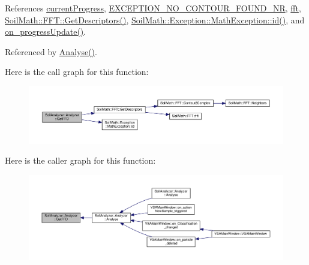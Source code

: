 References \hyperlink{analyzer_8h_source_l00067}{current\+Progress}, \hyperlink{_math_exception_8h_source_l00012}{E\+X\+C\+E\+P\+T\+I\+O\+N\+\_\+\+N\+O\+\_\+\+C\+O\+N\+T\+O\+U\+R\+\_\+\+F\+O\+U\+N\+D\+\_\+\+N\+R}, \hyperlink{analyzer_8h_source_l00072}{fft}, \hyperlink{_f_f_t_8cpp_source_l00015}{Soil\+Math\+::\+F\+F\+T\+::\+Get\+Descriptors()}, \hyperlink{_math_exception_8h_source_l00034}{Soil\+Math\+::\+Exception\+::\+Math\+Exception\+::id()}, and \hyperlink{class_soil_analyzer_1_1_analyzer_a808a8c21029471c4af0be996cb67d14c}{on\+\_\+progress\+Update()}.



Referenced by \hyperlink{analyzer_8cpp_source_l00065}{Analyse()}.



Here is the call graph for this function\+:
\nopagebreak
\begin{figure}[H]
\begin{center}
\leavevmode
\includegraphics[width=350pt]{class_soil_analyzer_1_1_analyzer_aeed5e3b158ff37d5fecb2816e12c3c31_cgraph}
\end{center}
\end{figure}




Here is the caller graph for this function\+:
\nopagebreak
\begin{figure}[H]
\begin{center}
\leavevmode
\includegraphics[width=350pt]{class_soil_analyzer_1_1_analyzer_aeed5e3b158ff37d5fecb2816e12c3c31_icgraph}
\end{center}
\end{figure}


\hypertarget{class_soil_analyzer_1_1_analyzer_af014193f37cc1cac631491687c292060}{}
